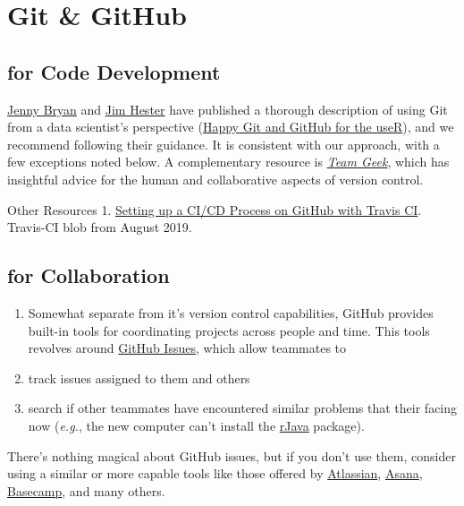 \documentclass[
]{book}
\begin{document}
\hypertarget{appendix-appendix}{%
\appendix}


\hypertarget{git}{%
\chapter{Git \& GitHub}\label{git}}

\hypertarget{git-code}{%
\section{for Code Development}\label{git-code}}

\href{https://github.com/jennybc}{Jenny Bryan} and \href{https://github.com/jimhester}{Jim Hester} have published a thorough description of using Git from a data scientist's perspective (\href{https://happygitwithr.com/}{Happy Git and GitHub for the useR}), and we recommend following their guidance. It is consistent with our approach, with a few exceptions noted below. A complementary resource is \emph{\href{https://smile.amazon.com/dp/1449302440}{Team Geek}}, which has insightful advice for the human and collaborative aspects of version control.

Other Resources
1. \href{https://blog.travis-ci.com/2019-05-30-setting-up-a-ci-cd-process-on-github}{Setting up a CI/CD Process on GitHub with Travis CI}. Travis-CI blob from August 2019.

\hypertarget{git-collaboration}{%
\section{for Collaboration}\label{git-collaboration}}

\begin{enumerate}
\def\labelenumi{\arabic{enumi}.}
\item
  Somewhat separate from it's version control capabilities, GitHub provides built-in tools for coordinating projects across people and time. This tools revolves around \href{https://guides.github.com/features/issues/}{GitHub Issues}, which allow teammates to
\item
  track issues assigned to them and others
\item
  search if other teammates have encountered similar problems that their facing now (\emph{e.g.}, the new computer can't install the \href{https://CRAN.R-project.org/package=rJava}{rJava} package).
\end{enumerate}

There's nothing magical about GitHub issues, but if you don't use them, consider using a similar or more capable tools like those offered by \href{https://www.atlassian.com/}{Atlassian}, \href{https://asana.com/}{Asana}, \href{https://basecamp.com/}{Basecamp}, and many others.
\end{document}
